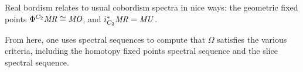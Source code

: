 Real bordism relates to usual cobordism spectra in nice ways: the geometric fixed points
$\Phi^{C_2}\mathit{MR}\cong\mathit{MO}$, and $i_{C_2}^*\mathit{MR} = \mathit{MU}$.

From here, one uses spectral sequences to compute that $\Omega$ satisfies the various criteria, including the
homotopy fixed points spectral sequence and the slice spectral sequence.
